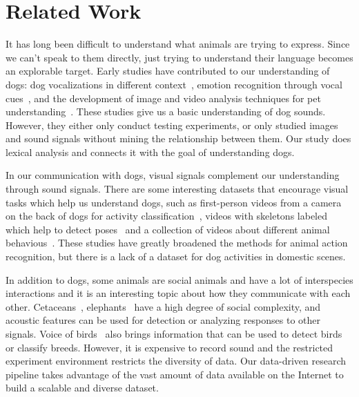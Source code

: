 \section{Related Work}
\label{sec:related}

It has long been difficult to understand what animals are trying to express. Since we can't speak to them directly, just trying to understand their language becomes an explorable target. Early studies have contributed to our understanding of dogs: dog vocalizations in different context~\cite{molnar2009dogs, robbins2000vocal}, emotion recognition through vocal cues~\cite{pongracz2006acoustic}, and the development of image and video analysis techniques for pet understanding~\cite{mao2023pet}. These studies give us a basic understanding of dog sounds. However, they either only conduct testing experiments, or only studied images and sound signals without mining the relationship between them. Our study does lexical analysis and connects it with the goal of understanding dogs.


In our communication with dogs, visual signals complement our understanding through sound signals. There are some interesting datasets that encourage visual tasks which help us understand dogs, such as first-person videos from a camera on the back of dogs for activity classification~\cite{iwashita2014first}, videos with skeletons labeled which help to detect poses~\cite{cao2019cross} and a collection of videos about different animal behavious~\cite{ng2022animal}. These studies have greatly broadened the methods for animal action recognition, but there is a lack of a dataset for dog activities in domestic scenes.



In addition to dogs, some animals are social animals and have a lot of interspecies interactions and it is an interesting topic about how they communicate with each other. Cetaceans~\cite{bermant2019deep}, elephants~\cite{rossman2020contagious} have a high degree of social complexity, and acoustic features can be used for detection or analyzing responses to other signals. Voice of birds~\cite{koh2019bird, salamon2017fusing, adavanne2017stacked} also brings information that can be used to detect birds or classify breeds. However, it is expensive to record sound and the restricted experiment environment restricts the diversity of data. Our data-driven research pipeline takes advantage of the vast amount of data available on the Internet to build a scalable and diverse dataset.

